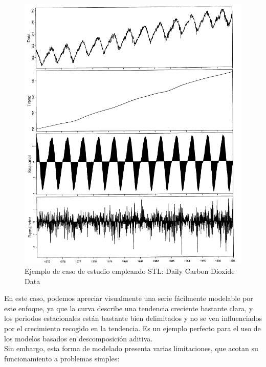 \begin{figure}[!htp] %
	\centering
	\includegraphics[scale=0.35]{img/stl}
	\caption{Ejemplo de caso de estudio empleando STL: Daily Carbon Dioxide Data \cite{cleveland1990stl}}
	\label{stl}
\end{figure}  	

En este caso, podemos apreciar visualmente una serie fácilmente modelable por este enfoque, ya que la curva describe una tendencia creciente bastante clara, y los periodos estacionales están bastante bien delimitados y no se ven influenciados por el crecimiento recogido en la tendencia. Es un ejemplo perfecto para el uso de los modelos basados en descomposición aditiva.\\

Sin embargo, esta forma de modelado presenta varias limitaciones, que acotan su funcionamiento a problemas simples:

